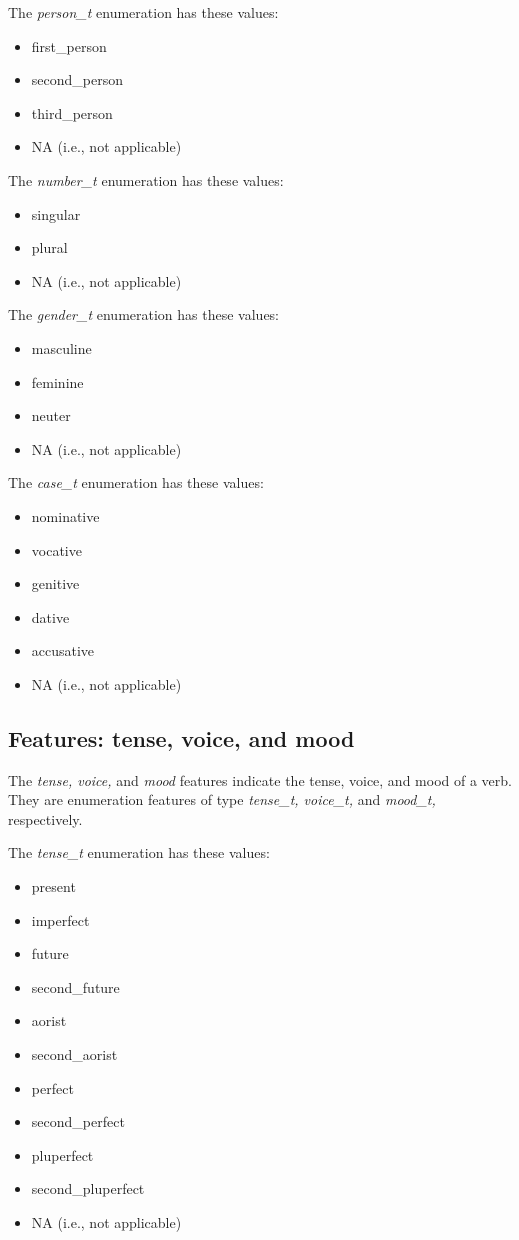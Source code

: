 \documentclass[11pt,oneside,a4paper]{memoir}
\begin{document}
The \emph{person\_t} enumeration has these values:

\begin{itemize}
\item first\_person
\item second\_person
\item third\_person
\item NA (i.e., not applicable)
\end{itemize}

The \emph{number\_t} enumeration has these values:

\begin{itemize}
\item singular
\item plural
\item NA (i.e., not applicable)
\end{itemize}

The \emph{gender\_t} enumeration has these values:

\begin{itemize}
\item masculine
\item feminine
\item neuter
\item NA (i.e., not applicable)
\end{itemize}

The \emph{case\_t} enumeration has these values:

\begin{itemize}
\item nominative
\item vocative
\item genitive
\item dative
\item accusative
\item NA (i.e., not applicable)
\end{itemize}

\subsection{Features: tense, voice, and mood}

The \emph{tense, voice,} and \emph{mood} features indicate the tense, voice, and
mood of a verb. They are enumeration features of type \emph{tense\_t, voice\_t,}
and \emph{mood\_t,} respectively.

The \emph{tense\_t} enumeration has these values:

\begin{itemize}
\item present
\item imperfect
\item future
\item second\_future
\item aorist
\item second\_aorist
\item perfect
\item second\_perfect
\item pluperfect
\item second\_pluperfect
\item NA (i.e., not applicable)
\end{itemize}
\end{document}

